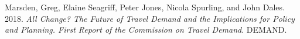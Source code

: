 \documentclass[11pt]{article}
\begin{document}
\leavevmode\hypertarget{ref-marsden_all_2018}{}%
Marsden, Greg, Elaine Seagriff, Peter Jones, Nicola Spurling, and John
Dales. 2018. \emph{All Change? The Future of Travel Demand and the
Implications for Policy and Planning. First Report of the Commission on
Travel Demand}. DEMAND.

% 
% 

\newpage
\appendix
%


%
%


\end{document}
